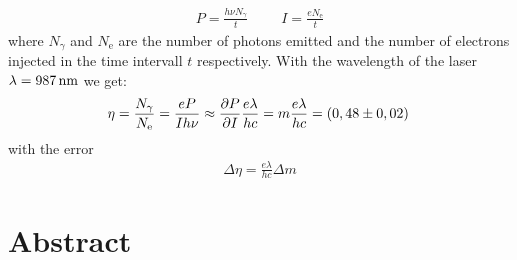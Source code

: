 \documentclass{protokoll_en}
\begin{document}
\begin{align}
P = \frac{h\nu N_\gamma}{t}\hspace{1cm} I = \frac{eN_\textrm{e}}{t}
\end{align}
where $N_\gamma$ and $N_\textrm{e}$ are the number of photons emitted and the number of electrons injected in the time intervall $t$ respectively. With the wavelength of the laser $\lambda = \unit[987]{nm}$ we get:
\begin{align}
\eta = \frac{N_\gamma}{N_\textrm{e}} = \frac{eP}{Ih\nu} \approx \frac{\partial P}{\partial I}\frac{e\lambda}{hc} = m\frac{e\lambda}{hc} = \unit[(0,48 \pm 0,02)]{}
\end{align}
with the error
\begin{align}
\Delta \eta = \frac{e\lambda}{hc}\Delta m
\end{align}
\section{Abstract}
\end{document}
